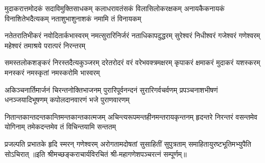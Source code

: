 
\fourlineindentedshloka
{मुदाकरात्तमोदकं सदाविमुक्तिसाधकम्}
{कलाधरावतंसकं विलासिलोकरक्षकम्}
{अनायकैकनायकं विनाशितेभदैत्यकम्}
{नताशुभाशुनाशकं नमामि तं विनायकम्}

\fourlineindentedshloka
{नतेतरातिभीकरं नवोदितार्कभास्वरम्}
{नमत्सुरारिनिर्जरं नताधिकापदुद्धरम्}
{सुरेश्वरं निधीश्वरं गजेश्वरं गणेश्वरम्}
{महेश्वरं तमाश्रये परात्परं निरन्तरम्}

\fourlineindentedshloka
{समस्तलोकशङ्करं निरस्तदैत्यकुञ्जरम्}
{दरेतरोदरं वरं वरेभवक्त्रमक्षरम्}
{कृपाकरं क्षमाकरं मुदाकरं यशस्करम्}
{मनस्करं नमस्कृतां नमस्करोमि भास्वरम्}

\fourlineindentedshloka
{अकिञ्चनार्तिमार्जनं चिरन्तनोक्तिभाजनम्}
{पुरारिपूर्वनन्दनं सुरारिगर्वचर्वणम्}
{प्रपञ्चनाशभीषणं धनञ्जयादिभूषणम्}
{कपोलदानवारणं भजे पुराणवारणम्}

\fourlineindentedshloka
{नितान्तकान्तदन्तकान्तिमन्तकान्तकात्मजम्}
{अचिन्त्यरूपमन्तहीनमन्तरायकृन्तनम्}
{हृदन्तरे निरन्तरं वसन्तमेव योगिनाम्}
{तमेकदन्तमेव तं विचिन्तयामि सन्ततम्}

{प्रजल्पति प्रभातके हृदि स्मरन् गणेश्वरम्}
{अरोगतामदोषतां सुसाहितीं सुपुत्रताम्}
{समाहितायुरष्टभूतिमभ्युपैति सोऽचिरात्}
॥इति श्रीमच्छङ्कराचार्यविरचितं श्री-महागणेशपञ्चरत्नं सम्पूर्णम्॥